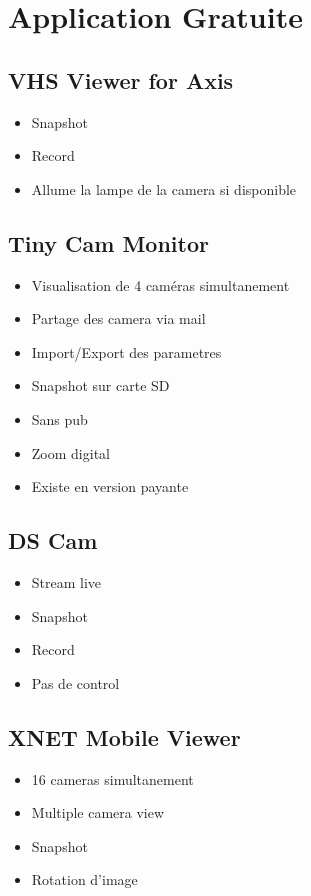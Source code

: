 \documentclass[a4paper,10pt]{report}
\begin{document}
\chapter[Application Gratuite]{Application Gratuite}
\section{VHS Viewer for Axis}
 \begin{itemize}
     \item Snapshot	
     \item Record
     \item Allume la lampe de la camera si disponible
 \end{itemize}
 
 \section{Tiny Cam Monitor}
 \begin{itemize}
     \item Visualisation de 4 caméras simultanement
     \item Partage des camera via mail
     \item Import/Export des parametres
     \item Snapshot sur carte SD
     \item Sans pub
     \item Zoom digital
     \item Existe en version payante
 \end{itemize}
 
 \section{DS Cam}
 \begin{itemize}
     \item Stream live
     \item Snapshot
     \item Record
     \item Pas de control
 \end{itemize}

 \section{XNET Mobile Viewer}
 \begin{itemize}
     \item 16 cameras simultanement
     \item Multiple camera view
     \item Snapshot
     \item Rotation d'image
 \end{itemize}
 
\end{document}
